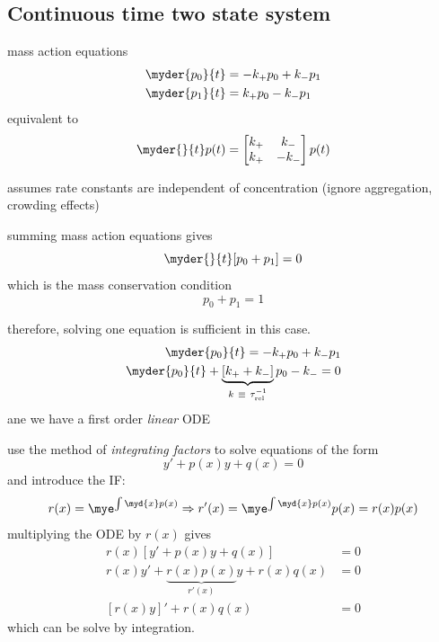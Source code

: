 \documentclass[twocolumn]{notes}
\begin{document}
\subsection{Continuous time two state system}
\begin{itemizec}
    \item mass action equations
    \begin{align*}
    \myder{p_0}{t} &= -k_+p_0 + k_-p_1 \\
    \myder{p_1}{t} &= k_+p_0 - k_-p_1
    \end{align*}
    equivalent to
    \[
        \myder{}{t}p(t) = \begin{bmatrix}
            k_+ & k_- \\ k_+ & -k_-
            \end{bmatrix} p(t)
    \]
    \item assumes rate constants are independent of concentration (ignore aggregation, crowding effects)
    \item summing mass action equations gives
    \[
        \myder{}{t}[p_0 + p_1] = 0
    \]
    which is the mass conservation condition
    \[
        p_0 + p_1 = 1
    \]
    \item therefore, solving one equation is sufficient in this case.
    \begin{align*}
        \myder{p_0}{t} = -k_+p_0 + k_-p_1 \\
        \myder{p_0}{t} + \underbrace{[k_+ + k_-]}_{k ~\equiv~ \tau_\mathrm{rel}^{-1}}p_0 - k_- = 0
    \end{align*}
    ane we have a first order \emph{linear} ODE
    \item use the method of \emph{integrating factors} to solve equations of the form
    \[
        y' + p(x)y + q(x) = 0
    \]
    and introduce the IF:
    \[
        r(x) = \mye^{\int\myd{x}p(x)} \Rightarrow r'(x) = \mye^{\int\myd{x}p(x)}p(x) = r(x)p(x)
    \]
    multiplying the ODE by $r(x)$ gives
    \begin{align*}
        r(x)[y' + p(x)y + q(x)] &= 0 \\
        r(x)y' + \underbrace{r(x)p(x)}_{r'(x)}y + r(x)q(x) &= 0 \\
        [r(x)y]' + r(x)q(x) &= 0
    \end{align*}
    which can be solve by integration.


\end{itemizec}
\end{document}
